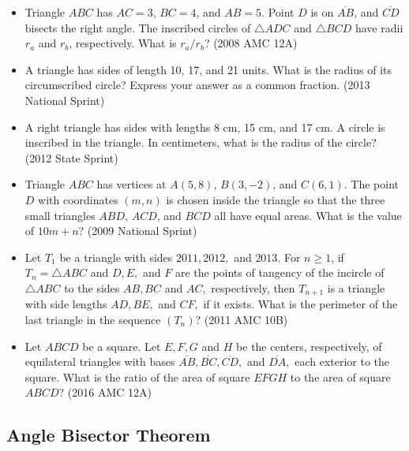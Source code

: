 \documentclass{article}
\begin{document}
\begin{itemize}

\item Triangle $ABC$ has $AC=3$, $BC=4$, and $AB=5$. Point $D$ is on $\overline{AB}$, and $\overline{CD}$ bisects the right angle. The inscribed circles of $\triangle ADC$ and $\triangle BCD$ have radii $r_a$ and $r_b$, respectively. What is $r_a/r_b$? (2008 AMC 12A)

\item A triangle has sides of length 10, 17, and 21 units. What is the radius of its circumscribed circle? Express your answer as a common fraction. (2013 National Sprint)

\item A right triangle has sides with lengths 8 cm, 15 cm, and 17 cm. A circle is inscribed in the triangle. In centimeters, what is the radius of the circle? (2012 State Sprint)

\item Triangle $ABC$ has vertices at $A(5,8)$, $B(3,-2)$, and $C(6,1)$. The point $D$ with coordinates $(m,n)$ is chosen inside the triangle so that the three small triangles $ABD$, $ACD$, and $BCD$ all have equal areas. What is the value of $10m+n$? (2009 National Sprint)

\item Let $T_1$ be a triangle with sides $2011, 2012,$ and $2013$. For $n \ge 1$, if $T_n = \triangle ABC$ and $D, E,$ and $F$ are the points of tangency of the incircle of $\triangle ABC$ to the sides $AB, BC$ and $AC,$ respectively, then $T_{n+1}$ is a triangle with side lengths $AD, BE,$ and $CF,$ if it exists. What is the perimeter of the last triangle in the sequence $( T_n )$? (2011 AMC 10B)

\item Let $ABCD$ be a square. Let $E, F, G$ and $H$ be the centers, respectively, of equilateral triangles with bases $\overline{AB}, \overline{BC}, \overline{CD},$ and $\overline{DA},$ each exterior to the square. What is the ratio of the area of square $EFGH$ to the area of square $ABCD$? (2016 AMC 12A)

\end{itemize}





\subsection{Angle Bisector Theorem}
\end{document}
